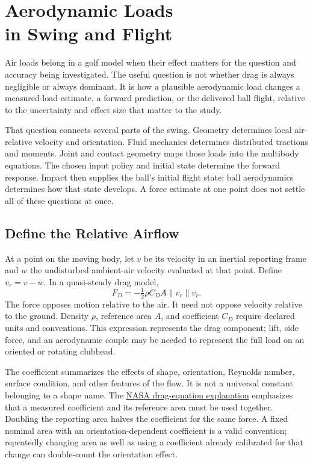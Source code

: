 \chapter[Aerodynamic Loads in Swing and Flight]{Aerodynamic Loads\\in Swing and Flight}
\label{ch:aerodynamic-drag}

Air loads belong in a golf model when their effect matters for the question and
accuracy being investigated. The useful question is not whether drag is always
negligible or always dominant. It is how a plausible aerodynamic load changes
a measured-load estimate, a forward prediction, or the delivered ball flight,
relative to the uncertainty and effect size that matter to the study.

That question connects several parts of the swing. Geometry determines local
air-relative velocity and orientation. Fluid mechanics determines distributed
tractions and moments. Joint and contact geometry maps those loads into the
multibody equations. The chosen input policy and initial state determine the
forward response. Impact then supplies the ball's initial flight state; ball
aerodynamics determines how that state develops. A force estimate at one point
does not settle all of these questions at once.

\section{Define the Relative Airflow}

At a point on the moving body, let $v$ be its velocity in an inertial reporting
frame and $w$ the undisturbed ambient-air velocity evaluated at that point.
Define $v_r=v-w$. In a quasi-steady drag model,
\begin{equation}
 F_D=-\tfrac12\rho C_D A\|v_r\|v_r.
 \label{eq:drag-vector}
\end{equation}
The force opposes motion relative to the air. It need not oppose velocity
relative to the ground. Density $\rho$, reference area $A$, and coefficient
$C_D$ require declared units and conventions. This expression represents the
drag component; lift, side force, and an aerodynamic couple may be needed to
represent the full load on an oriented or rotating clubhead.

The coefficient summarizes the effects of shape, orientation, Reynolds number,
surface condition, and other features of the flow. It is not a universal
constant belonging to a shape name. The
\href{https://www1.grc.nasa.gov/beginners-guide-to-aeronautics/drag-equation/}{NASA drag-equation explanation}
emphasizes that a measured coefficient and its reference area must be used
together. Doubling the reporting area halves the coefficient for the same force.
A fixed nominal area with an orientation-dependent coefficient is a valid
convention; repeatedly changing area as well as using a coefficient already
calibrated for that change can double-count the orientation effect.

